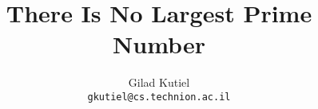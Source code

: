 \title{There Is No Largest Prime Number}
\author{
Gilad Kutiel 
\texorpdfstring{\\
\texttt{gkutiel@cs.technion.ac.il}
}{}}
\date{}
